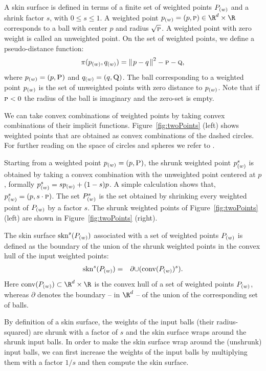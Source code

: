 A skin surface is defined in terms of a finite set of weighted points
${P}_{(w)}$ and a shrink factor $s$, with $0\leq s\leq 1$. A weighted
point $\ssWpoint{p}=({p},\textsc{p})\in \R^d\times\R$ corresponds to a ball
with center ${p}$ and radius $\sqrt{\textsc{p}}$. A weighted point
with zero weight is called an unweighted point. On the set of weighted
points, we define a pseudo-distance function:
\[
  \pi({p}_{(w)},{q}_{(w)}) = {\parallel\! p-q \!\parallel}^2 - \textsc{p} - \textsc{q},
\]
where ${p}_{(w)} = (p,\textsc{P})$ and ${q}_{(w)} = (q,\textsc{Q})$.  The
ball corresponding to a weighted point ${p}_{(w)}$ is the set of
unweighted points with zero distance to ${p}_{(w)}$. Note that if
$\textsc{p}<0$ the radius of the ball is imaginary and the zero-set is
empty.

We can take convex combinations of weighted points by taking convex
combinations of their implicit functions. Figure~\ref{fig:twoPoints}
(left) shows weighted points that are obtained as convex combinations
of the dashed circles. For further reading on the space of circles and
spheres we refer to \cite{p-gcc-70}.

Starting from a weighted point ${p}_{(w)}=({p},\textsc{P})$, the
shrunk weighted point ${p}_{(w)}^s$ is obtained by taking a convex
combination with the unweighted point centered at $p$, formally
${p}_{(w)}^s = s {p}_{(w)} + (1-s) p$. A simple calculation
shows that, ${p}_{(w)}^s = ({p},s\cdot \textsc{p})$.  The set
${P}_{(w)}^s$ is the set obtained by shrinking every weighted point
of ${P}_{(w)}$ by a factor $s$. The shrunk weighted points of
Figure~\ref{fig:twoPoints} (left) are shown in
Figure~\ref{fig:twoPoints} (right).

The skin surface $\mbox{skn}^{s}({P}_{(w)})$ associated with a set
of weighted points ${P}_{(w)}$ is defined as the boundary of the
union of the shrunk weighted points in the convex hull of the input
weighted points:
\begin{eqnarray}
  \label{eq:defskin}
  \mbox{skn}^{s}({P}_{(w)}) &=& \partial{\cup(\mbox{conv} ({P}_{(w)})^s)}.
\end{eqnarray}
%
Here $\mbox{conv}(\ssWpoint{P}) \subset \R^d\times\R$ is the convex
hull of a set of weighted points ${P}_{(w)}$, whereas $\partial$
denotes the boundary -- in $\R^d$ -- of the union of the corresponding
set of balls. 

By definition of a skin surface, the weights of the input balls (their
radius-squared) are shrunk with a factor of $s$ and the skin surface
wraps around the shrunk input balls. In order to make the skin surface
wrap around the (unshrunk) input balls, we can first increase the
weights of the input balls by multiplying them with a factor $1/s$ and
then compute the skin surface.

